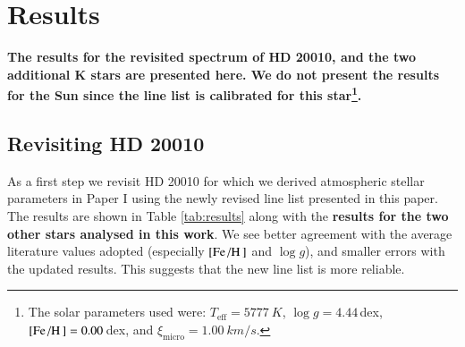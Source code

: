 \documentclass{aa}
\begin{document}
\section{Results}
\label{sec:results}

{\bf The results for the revisited spectrum of HD 20010, and the two additional K stars are
presented here. We do not present the results for the Sun since the line list is calibrated for this
star\footnote{The solar parameters used were: $T_\mathrm{eff}=\SI{5777}{K}$, $\log g=4.44\,$dex,
$[\ion{Fe}/\ion{H}]=0.00\,$dex, and $\xi_\mathrm{micro}=\SI{1.00}{km/s}$.}.}

\subsection{Revisiting HD 20010}
\label{sec:hd20010}

As a first step we revisit HD 20010 for which we derived atmospheric stellar
parameters in Paper I using the newly revised line list presented in this paper.
The results are shown in Table \ref{tab:results} along with the {\bf results for
the two other stars analysed in this work}. We see better agreement with the
average literature values adopted (especially $[\ion{Fe}/\ion{H}]$ and $\log g$),
and smaller errors with the updated results. This suggests that the new line
list is more reliable.
\end{document}
